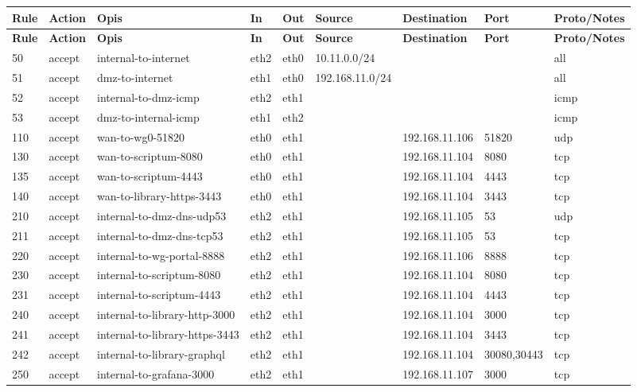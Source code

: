 \begin{longtable}{|l|l|l|l|l|l|l|p{2.2cm}|l|}
\hline
\textbf{Rule} & \textbf{Action} & \textbf{Opis} & \textbf{In} & \textbf{Out} & \textbf{Source} & \textbf{Destination} & \textbf{Port} & \textbf{Proto/Notes} \\
\hline
\endfirsthead
\hline
\textbf{Rule} & \textbf{Action} & \textbf{Opis} & \textbf{In} & \textbf{Out} & \textbf{Source} & \textbf{Destination} & \textbf{Port} & \textbf{Proto/Notes} \\
\hline
\endhead
50 & accept & internal-to-internet & eth2 & eth0 & 10.11.0.0/24 &  &  & all \\
51 & accept & dmz-to-internet & eth1 & eth0 & 192.168.11.0/24 &  &  & all \\
52 & accept & internal-to-dmz-icmp & eth2 & eth1 &  &  &  & icmp \\
53 & accept & dmz-to-internal-icmp & eth1 & eth2 &  &  &  & icmp \\
110 & accept & wan-to-wg0-51820 & eth0 & eth1 &  & 192.168.11.106 & 51820 & udp \\
130 & accept & wan-to-scriptum-8080 & eth0 & eth1 &  & 192.168.11.104 & 8080 & tcp \\
135 & accept & wan-to-scriptum-4443 & eth0 & eth1 &  & 192.168.11.104 & 4443 & tcp \\
140 & accept & wan-to-library-https-3443 & eth0 & eth1 &  & 192.168.11.104 & 3443 & tcp \\
210 & accept & internal-to-dmz-dns-udp53 & eth2 & eth1 &  & 192.168.11.105 & 53 & udp \\
211 & accept & internal-to-dmz-dns-tcp53 & eth2 & eth1 &  & 192.168.11.105 & 53 & tcp \\
220 & accept & internal-to-wg-portal-8888 & eth2 & eth1 &  & 192.168.11.106 & 8888 & tcp \\
230 & accept & internal-to-scriptum-8080 & eth2 & eth1 &  & 192.168.11.104 & 8080 & tcp \\
231 & accept & internal-to-scriptum-4443 & eth2 & eth1 &  & 192.168.11.104 & 4443 & tcp \\
240 & accept & internal-to-library-http-3000 & eth2 & eth1 &  & 192.168.11.104 & 3000 & tcp \\
241 & accept & internal-to-library-https-3443 & eth2 & eth1 &  & 192.168.11.104 & 3443 & tcp \\
242 & accept & internal-to-library-graphql & eth2 & eth1 &  & 192.168.11.104 & 30080,30443 & tcp \\
250 & accept & internal-to-grafana-3000 & eth2 & eth1 &  & 192.168.11.107 & 3000 & tcp \\

\end{longtable}
